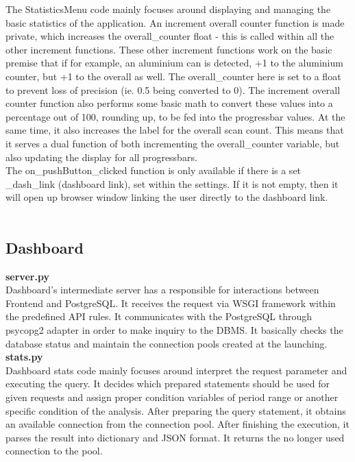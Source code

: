 \documentclass[conference]{IEEEtran}
\begin{document}
The StatisticsMenu code mainly focuses around displaying and managing the basic statistics of the application. An increment overall counter function is made private, which increases the overall\_counter float - this is called within all the other increment functions. These other increment functions work on the basic premise that if for example, an aluminium can is detected, +1 to the aluminium counter, but +1 to the overall as well. The overall\_counter here is set to a float to prevent loss of precision (ie. 0.5 being converted to 0). The increment overall counter function also performs some basic math to convert these values into a percentage out of 100, rounding up, to be fed into the progressbar values. At the same time, it also increases the label for the overall scan count. This means that it serves a dual function of both incrementing the overall\_counter variable, but also updating the display for all progressbars.\\

The on\_pushButton\_clicked function is only available if there is a set \_dash\_link (dashboard link), set within the settings. If it is not empty, then it will open up browser window linking the user directly to the dashboard link.~\\~\\

\subsection{Dashboard}

\textbf{server.py}~\\

Dashboard's intermediate server has a responsible for interactions between Frontend and PostgreSQL. It receives the request via WSGI framework within the predefined API rules. It communicates with the PostgreSQL through psycopg2 adapter in order to make inquiry to the DBMS. It basically checks the database status and maintain the connection pools created at the launching.~\\

\textbf{stats.py}~\\

Dashboard stats code mainly focuses around interpret the request parameter and executing the query. It decides which prepared statements should be used for given requests and assign proper condition variables of period range or another specific condition of the analysis. After preparing the query statement, it obtains an available connection from the connection pool. After finishing the execution, it parses the result into dictionary and JSON format. It returns the no longer used connection to the pool.~\\
\end{document}
